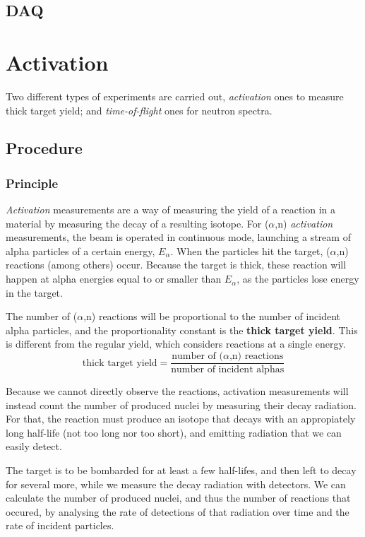 \documentclass[a4paper,12pt]{report}
\newcommand{\an}{($\alpha$,n) }
\begin{document}
\section{DAQ}


\chapter{Activation}
Two different types of experiments are carried out, \textit{activation} ones to measure thick target yield; and \textit{time-of-flight} ones for neutron spectra.

\section{Procedure}

\subsection{Principle}
\textit{Activation} measurements are a way of measuring the yield of a reaction in a material by measuring the decay of a resulting isotope.
For \an \textit{activation} measurements, the beam is operated in continuous mode, launching a stream of alpha particles of a certain energy, $E_\alpha$.
When the particles hit the target, \an reactions (among others) occur.
Because the target is thick, these reaction will happen at alpha energies equal to or smaller than $E_\alpha$, as the particles lose energy in the target.

The number of \an reactions will be proportional to the number of incident alpha particles, and the proportionality constant is the \textbf{thick target yield}.
This is different from the regular yield, which considers reactions at a single energy.
\begin{equation}
	\text{thick target yield} = \frac{\text{number of \an reactions}}{\text{number of incident alphas}}
	\label{tty_def}
\end{equation}

Because we cannot directly observe the reactions, activation measurements will instead count the number of produced nuclei by measuring their decay radiation.
For that, the reaction must produce an isotope that decays with an appropiately long half-life (not too long nor too short), and emitting radiation that we can easily detect.

The target is to be bombarded for at least a few half-lifes, and then left to decay for several more, while we measure the decay radiation with detectors.
We can calculate the number of produced nuclei, and thus the number of reactions that occured, by analysing the rate of detections of that radiation over time and the rate of incident particles.
\end{document}

